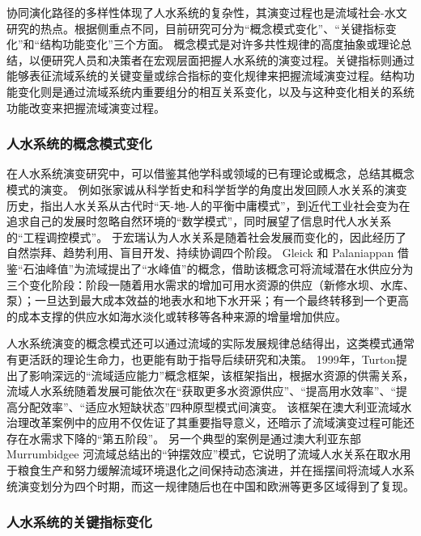 协同演化路径的多样性体现了人水系统的复杂性，其演变过程也是流域社会-水文研究的热点。根据侧重点不同，目前研究可分为“概念模式变化”、“关键指标变化”和“结构功能变化”三个方面。
概念模式是对许多共性规律的高度抽象或理论总结，以便研究人员和决策者在宏观层面把握人水系统的演变过程。关键指标则通过能够表征流域系统的关键变量或综合指标的变化规律来把握流域演变过程。结构功能变化则是通过流域系统内重要组分的相互关系变化，以及与这种变化相关的系统功能改变来把握流域演变过程。

\subsubsection{人水系统的概念模式变化}

在人水系统演变研究中，可以借鉴其他学科或领域的已有理论或概念，总结其概念模式的演变。
例如张家诚从科学哲史和科学哲学的角度出发回顾人\textendash{}水关系的演变历史，指出人\textendash{}水关系从古代时“天-地-人的平衡中庸模式”，到近代工业社会变为在追求自己的发展时忽略自然环境的“数学模式”，同时展望了信息时代人\textendash{}水关系的“工程调控模式”\cite{zhang2006}。
于宏瑞认为人\textendash{}水关系是随着社会发展而变化的，因此经历了自然崇拜、趋势利用、盲目开发、持续协调四个阶段\cite{yuruihong2011}。
Gleick 和 Palaniappan 借鉴“石油峰值”为流域提出了“水峰值”的概念，借助该概念可将流域潜在水供应分为三个变化阶段：阶段一随着用水需求的增加可用水资源的供应（新修水坝、水库、泵）；一旦达到最大成本效益的地表水和地下水开采；有一个最终转移到一个更高的成本支撑的供应水如海水淡化或转移等各种来源的增量增加供应\cite{gleick2010}。

人水系统演变的概念模式还可以通过流域的实际发展规律总结得出，这类模式通常有更活跃的理论生命力，也更能有助于指导后续研究和决策。
1999年，Turton提出了影响深远的“流域适应能力”概念框架，该框架指出，根据水资源的供需关系，流域人水系统随着发展可能依次在“获取更多水资源供应”、“提高用水效率”、“提高分配效率”、“适应水短缺状态”四种原型模式间演变\cite{turton1999}。
该框架在澳大利亚流域水治理改革案例中的应用不仅佐证了其重要指导意义，还暗示了流域演变过程可能还存在水需求下降的“第五阶段”\cite{loch2020}。
另一个典型的案例是通过澳大利亚东部 Murrumbidgee 河流域总结出的“钟摆效应”模式，它说明了流域人\textendash{}水关系在取水用于粮食生产和努力缓解流域环境退化之间保持动态演进，并在摇摆间将流域人水系统演变划分为四个时期\cite{kandasamy2014, roobavannan2017}，而这一规律随后也在中国和欧洲等更多区域得到了复现\cite{han2017, mostert2018}。

\subsubsection{人水系统的关键指标变化}

